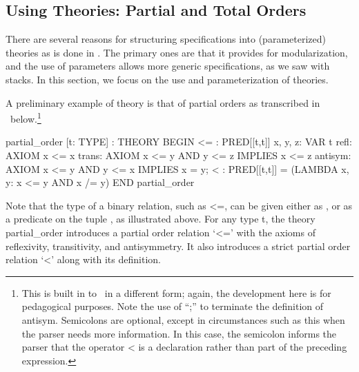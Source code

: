 \subsection{Using Theories: Partial and Total Orders}
\label{using-theories}

There are several reasons for structuring specifications into
(parameterized) theories as is done in \pvs\@.  The primary ones are
that it provides for modularization, and the use of parameters allows
more generic specifications, as we saw with stacks.  In this section, we
focus on the use and parameterization of theories.

A preliminary example of theory is that of partial orders as
transcribed in \pvs\ below.\footnote{This is built in to \pvs\ in a
different form; again, the development here is for pedagogical
purposes. Note the use of ``;'' to terminate the definition of {\stt
antisym}. Semicolons are optional, except in circumstances such as
this when the parser needs more information.  In this case, the
semicolon informs the parser that the operator {\stt <} is a
declaration rather than part of the preceding expression.}
\begin{pvsexample}
  partial_order [t: TYPE] : THEORY
   BEGIN
    <= : PRED[[t,t]]
    x, y, z: VAR t
    refl: AXIOM x <= x
    trans: AXIOM  x <= y AND y <= z IMPLIES x <= z
    antisym: AXIOM x <= y AND y <= x IMPLIES x = y;
    < : PRED[[t,t]] = (LAMBDA x, y: x <= y AND x /= y)
   END partial_order
\end{pvsexample}
%
Note that the type of a binary relation, such as {\stt <=}, can be given
either as {\stt [t, t -> bool]}, or as a predicate on the tuple {\stt
[t, t]}, as illustrated above.
For any type {\stt t}, the theory {\stt partial\_order} introduces a
partial order relation `{\stt <=}' with the axioms of reflexivity,
transitivity, and antisymmetry.  It also introduces a strict partial
order relation `{\stt <}' along with its definition. 

